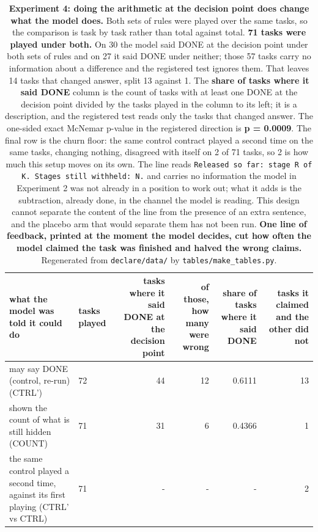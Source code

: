 \documentclass[11pt]{article}
\begin{document}
\begin{table}[t]
\centering
\small
\setlength{\tabcolsep}{3.4pt}
\begin{tabularx}{\textwidth}{L{2.858}L{0.571}R{0.762}R{0.571}R{0.571}R{0.667}}
\toprule
\textbf{what the model was told it could do} & \textbf{tasks played} & \textbf{tasks where it said DONE at the decision point} & \textbf{of those, how many were wrong} & \textbf{share of tasks where it said DONE} & \textbf{tasks it claimed and the other did not} \\
\midrule
may say DONE (control, re-run) (CTRL') & 72 & 44 & 12 & 0.6111 & 13 \\
shown the count of what is still hidden (COUNT) & 71 & 31 & 6 & 0.4366 & 1 \\
the same control played a second time, against its first playing (CTRL' vs CTRL) & 71 & - & - & - & 2 \\
\bottomrule
\end{tabularx}
\caption{\textbf{Experiment 4: doing the arithmetic at the decision point does change what the model does.} Both sets of rules were played over the same tasks, so the comparison is task by task rather than total against total. \textbf{71 tasks were played under both.} On 30 the model said DONE at the decision point under both sets of rules and on 27 it said DONE under neither; those 57 tasks carry no information about a difference and the registered test ignores them. That leaves 14 tasks that changed answer, split 13 against 1. The \textbf{share of tasks where it said DONE} column is the count of tasks with at least one DONE at the decision point divided by the tasks played in the column to its left; it is a description, and the registered test reads only the tasks that changed answer. The one-sided exact McNemar p-value in the registered direction is \textbf{p = 0.0009}. The final row is the churn floor: the same control contract played a second time on the same tasks, changing nothing, disagreed with itself on 2 of 71 tasks, so 2 is how much this setup moves on its own. The line reads \texttt{Released so far: stage R of K. Stages still withheld: N.} and carries no information the model in Experiment 2 was not already in a position to work out; what it adds is the subtraction, already done, in the channel the model is reading. This design cannot separate the content of the line from the presence of an extra sentence, and the placebo arm that would separate them has not been run. \textbf{One line of feedback, printed at the moment the model decides, cut how often the model claimed the task was finished and halved the wrong claims.} Regenerated from \texttt{declare/data/} by \texttt{tables/make\_tables.py}.}
\label{tab:T6}
\end{table}
\end{document}
